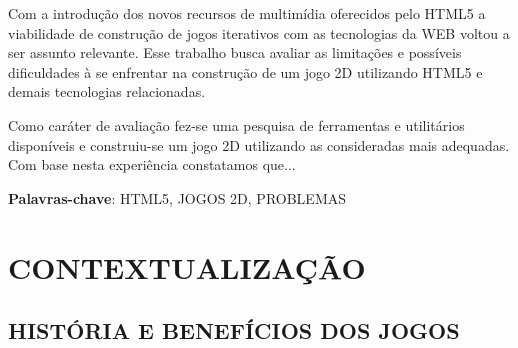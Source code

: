 \documentclass{article}
\begin{document}
 
Com a introdução dos novos recursos de multimídia oferecidos pelo HTML5 a viabilidade de construção de jogos iterativos com as tecnologias da WEB voltou a ser assunto relevante. Esse trabalho busca avaliar as limitações e possíveis dificuldades à se enfrentar na construção de um jogo 2D utilizando HTML5 e demais tecnologias relacionadas.

Como caráter de avaliação fez-se uma pesquisa de ferramentas e utilitários disponíveis e construiu-se um jogo 2D utilizando as consideradas mais adequadas. Com base nesta experiência constatamos que...


\textbf{Palavras-chave}: HTML5, JOGOS 2D, PROBLEMAS

\newpage

\listoffigures
\listoftables
\newpage

\tableofcontents
\newpage

\section{CONTEXTUALIZAÇÃO}
\subsection{HISTÓRIA E BENEFÍCIOS DOS JOGOS}
\end{document}
